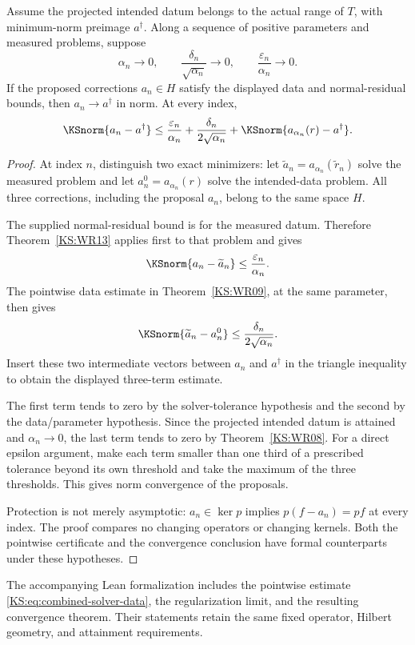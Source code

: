 \begin{KStheorem}\label{KS:WR16}
Assume the projected intended datum belongs to the actual range of $T$, with minimum-norm preimage $a^\dagger$. Along a sequence of positive parameters and measured problems, suppose
\[
 \alpha_n\to0,\qquad
 \frac{\delta_n}{\sqrt{\alpha_n}}\to0,\qquad
 \frac{\varepsilon_n}{\alpha_n}\to0.
\]
If the proposed corrections $a_n\in H$ satisfy the displayed data and normal-residual bounds, then $a_n\to a^\dagger$ in norm. At every index,
\[
 \KSnorm{a_n-a^\dagger}
 \le\frac{\varepsilon_n}{\alpha_n}
      +\frac{\delta_n}{2\sqrt{\alpha_n}}
      +\KSnorm{a_{\alpha_n}(r)-a^\dagger}.
\]
\end{KStheorem}
\begin{proof}
At index $n$, distinguish two exact minimizers: let $\widetilde a_n=a_{\alpha_n}(\widetilde r_n)$ solve the measured problem and let $a_n^0=a_{\alpha_n}(r)$ solve the intended-data problem. All three corrections, including the proposal $a_n$, belong to the same space $H$.

The supplied normal-residual bound is for the measured datum. Therefore Theorem~\ref{KS:WR13} applies first to that problem and gives
\[
 \KSnorm{a_n-\widetilde a_n}\le\frac{\varepsilon_n}{\alpha_n}.
\]
The pointwise data estimate in Theorem~\ref{KS:WR09}, at the same parameter, then gives
\[
 \KSnorm{\widetilde a_n-a_n^0}\le\frac{\delta_n}{2\sqrt{\alpha_n}}.
\]
Insert these two intermediate vectors between $a_n$ and $a^\dagger$ in the triangle inequality to obtain the displayed three-term estimate.

The first term tends to zero by the solver-tolerance hypothesis and the second by the data/parameter hypothesis. Since the projected intended datum is attained and $\alpha_n\to0$, the last term tends to zero by Theorem~\ref{KS:WR08}. For a direct epsilon argument, make each term smaller than one third of a prescribed tolerance beyond its own threshold and take the maximum of the three thresholds. This gives norm convergence of the proposals.

Protection is not merely asymptotic: $a_n\in\ker p$ implies $p(f-a_n)=pf$ at every index. The proof compares no changing operators or changing kernels. Both the pointwise certificate and the convergence conclusion have formal counterparts under these hypotheses.
\end{proof}

The accompanying Lean formalization includes the pointwise estimate \eqref{KS:eq:combined-solver-data}, the regularization limit, and the resulting convergence theorem. Their statements retain the same fixed operator, Hilbert geometry, and attainment requirements.

